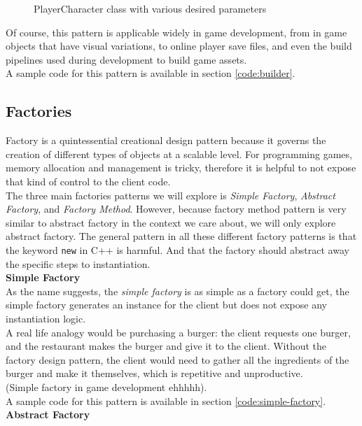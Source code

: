 \begin{multicols}{2}
\begin{figure}[H]
	\caption{PlayerCharacter class with various desired parameters}
	\label{fig:playercharacter-2}
\end{figure}

Of course, this pattern is applicable widely in game development, from in game objects that have visual variations, to online player save files, and even the build pipelines used during development to build game assets.\bs
\\
A sample code for this pattern is available in section \ref{code:builder}.

\subsection{Factories}

Factory is a quintessential creational design pattern because it governs the creation of different types of objects at a scalable level. For programming games, memory allocation and management is tricky, therefore it is helpful to not expose that kind of control to the client code.\bs
\\
The three main factories patterns we will explore is \textit{Simple Factory}, \textit{Abstract Factory}, and \textit{Factory Method}. However, because factory method pattern is very similar to abstract factory\cite{sm-factory-method} in the context we care about, we will only explore abstract factory. The general pattern in all these different factory patterns is that the keyword \texttt{new} in C++ is harmful. And that the factory should abstract away the specific steps to instantiation.\bs
\\
\textbf{Simple Factory}\\
As the name suggests, the \textit{simple factory} is as simple as a factory could get, the simple factory generates an instance for the client but does not expose any instantiation logic.\cite{simple-factory}\bs
\\
A real life analogy would be purchasing a burger: the client requests one burger, and the restaurant makes the burger and give it to the client. Without the factory design pattern, the client would need to gather all the ingredients of the burger and make it themselves, which is repetitive and unproductive.\bs
\\
(Simple factory in game development ehhhhh).\bs
\\
A sample code for this pattern is available in section \ref{code:simple-factory}.\bs
\\
\textbf{Abstract Factory}
\\

\end{multicols}
